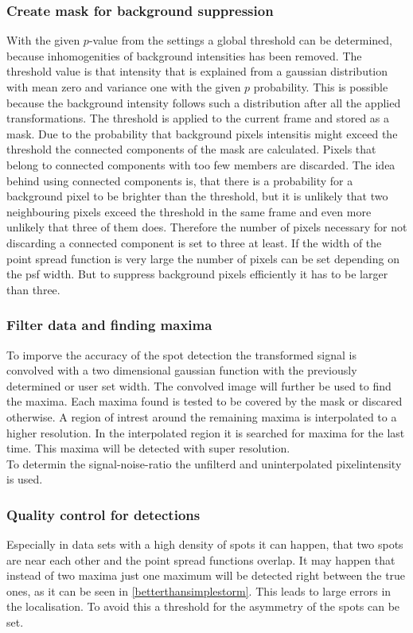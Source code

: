 \subsubsection{Create mask for background suppression}
With the given $p$-value from the settings a global threshold can be determined, because inhomogenities of background intensities has been removed. The threshold value is that intensity that is explained from a gaussian distribution with mean zero and variance one with the given $p$ probability. This is possible because the background intensity follows such a distribution after all the applied transformations.\newline
The threshold is applied to the current frame and stored as a mask. Due to the probability that background pixels intensitis might exceed the threshold the connected components of the mask are calculated. Pixels that belong to connected components with too few members are discarded. The idea behind using connected components is, that there is a probability for a background pixel to be brighter than the threshold, but it is unlikely that two neighbouring pixels exceed the threshold in the same frame and even more unlikely that three of them does. Therefore the number of pixels necessary for not discarding a connected component is set to three at least. If the width of the point spread function is very large the number of pixels can be set depending on the psf width. But to suppress background pixels efficiently it has to be larger than three.
\subsubsection{Filter data and finding maxima}
To imporve the accuracy of the spot detection the transformed signal is convolved with a two dimensional gaussian function with the previously determined or user set width. The convolved image will further be used to find the maxima. Each maxima found is tested to be covered by the mask or discared otherwise. A region of intrest around the remaining maxima is interpolated to a higher resolution. In the interpolated region  it is searched for maxima for the last time. This maxima will be detected with super resolution.\\
To determin the signal-noise-ratio the unfilterd and uninterpolated pixelintensity is used.

\subsubsection{Quality control for detections}
Especially in data sets with a high density of spots it can happen, that two spots are near each other and the point spread functions overlap. It may happen that instead of two maxima just one maximum will be detected right between the true ones, as it can be seen in \ref{betterthansimplestorm}. This leads to large errors in the localisation. To avoid this a threshold for the asymmetry of the spots can be set.


